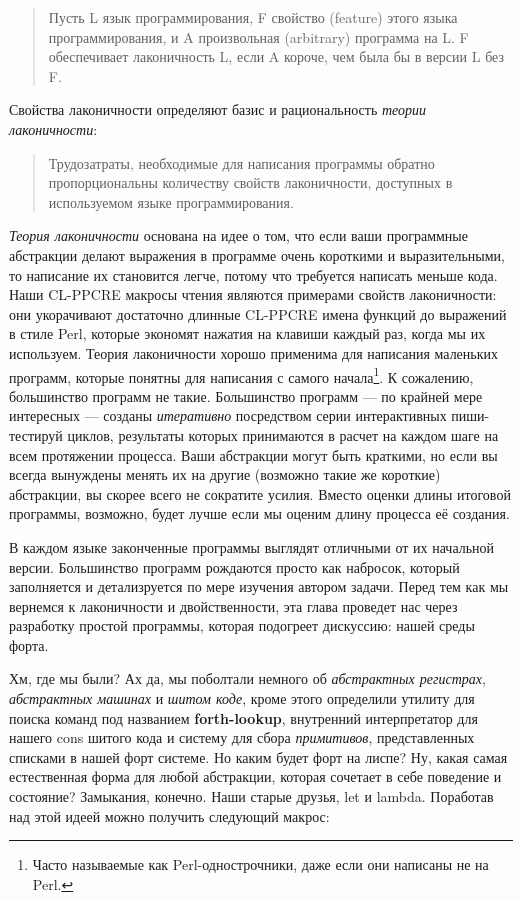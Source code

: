 \begin{quote}
Пусть L язык программирования, F свойство (feature) этого языка программирования, и A произвольная (arbitrary) программа на L. F обеспечивает лаконичность L, если A короче, чем была бы в версии L без F. 
\end{quote}

Свойства лаконичности определяют базис и рациональность \emph{теории лаконичности}:

\begin{quote}
Трудозатраты, необходимые для написания программы обратно пропорциональны количеству свойств лаконичности, доступных в используемом языке программирования.
\end{quote}

\emph{Теория лаконичности} основана на идее о том, что если ваши программные абстракции делают выражения в программе очень короткими и выразительными, то написание их становится легче, потому что требуется написать меньше кода. Наши CL-PPCRE макросы чтения являются примерами свойств лаконичности: они укорачивают достаточно длинные CL-PPCRE имена функций до выражений в стиле Perl, которые экономят нажатия на клавиши каждый раз, когда мы их используем. Теория лаконичности хорошо применима для написания маленьких программ, которые понятны для написания с самого начала\footnote{Часто называемые как Perl-однострочники, даже если они написаны не на Perl.}. К сожалению, большинство программ не такие. Большинство программ --- по крайней мере интересных --- созданы \emph{итеративно} посредством серии интерактивных пиши-тестируй циклов, результаты которых принимаются в расчет на каждом шаге на всем протяжении процесса. Ваши абстракции могут быть краткими, но если вы всегда вынуждены менять их на другие (возможно такие же короткие) абстракции, вы скорее всего не сократите усилия. Вместо оценки длины итоговой программы, возможно, будет лучше если мы оценим длину процесса её создания.

В каждом языке законченные программы выглядят отличными от их начальной версии. Большинство программ рождаются просто как набросок, который заполняется и детализруется по мере изучения автором задачи. Перед тем как мы вернемся к лаконичности и двойственности, эта глава проведет нас через разработку простой программы, которая подогреет дискуссию: нашей среды форта.

Хм, где мы были? Ах да, мы поболтали немного об \emph{абстрактных регистрах}, \emph{абстрактных машинах} и \emph{шитом коде}, кроме этого определили утилиту для поиска команд под названием \textbf{forth-lookup}, внутренний интерпретатор для нашего cons шитого кода и систему для сбора \emph{примитивов}, представленных списками в нашей форт системе. Но каким будет форт на лиспе? Ну, какая самая естественная форма для любой абстракции, которая сочетает в себе поведение и состояние? Замыкания, конечно. Наши старые друзья, let и lambda. Поработав над этой идеей можно получить следующий макрос: 

